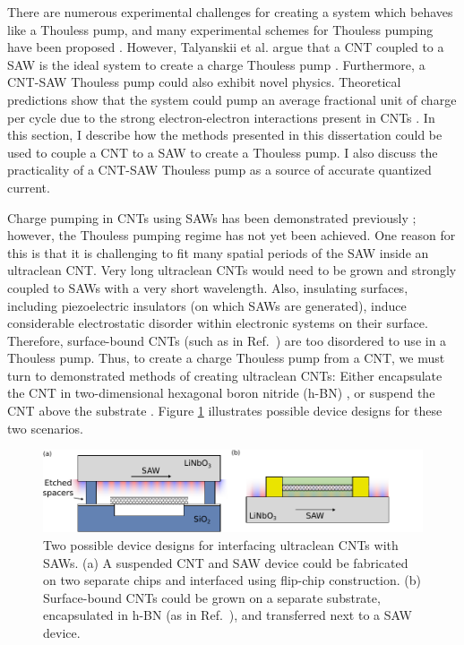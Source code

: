 \documentclass{beavtex_dub_edit}
\begin{document}
There are numerous experimental challenges for creating a system which behaves like a Thouless pump, and many experimental schemes for Thouless pumping have been proposed \cite{citro_thouless_2023}. However, Talyanskii et al. argue that a CNT coupled to a SAW is the ideal system to create a charge Thouless pump \cite{talyanskii_quantized_2001}. Furthermore, a CNT-SAW Thouless pump could also exhibit novel physics. Theoretical predictions show that the system could pump an average fractional unit of charge per cycle due to the strong electron-electron interactions present in CNTs \cite{novikov_devils_2005}. In this section, I describe how the methods presented in this dissertation could be used to couple a CNT to a SAW to create a Thouless pump. I also discuss the practicality of a CNT-SAW Thouless pump as a source of accurate quantized current.

Charge pumping in CNTs using SAWs has been demonstrated previously \cite{buitelaar_adiabatic_2008}; however, the Thouless pumping regime has not yet been achieved. One reason for this is that it is challenging to fit many spatial periods of the SAW inside an ultraclean CNT. Very long ultraclean CNTs would need to be grown and strongly coupled to SAWs with a very short wavelength. Also, insulating surfaces, including piezoelectric insulators (on which SAWs are generated), induce considerable electrostatic disorder within electronic systems on their surface. Therefore, surface-bound CNTs (such as in Ref.\ \cite{buitelaar_adiabatic_2008}) are too disordered to use in a Thouless pump. Thus, to create a charge Thouless pump from a CNT, we must turn to demonstrated methods of creating ultraclean CNTs: Either encapsulate the CNT in two-dimensional hexagonal boron nitride (h-BN) \cite{huang_superior_2015}, or suspend the CNT above the substrate \cite{senger_universal_2018}. Figure \ref{Thouless pump designs} illustrates possible device designs for these two scenarios.


\begin{figure}
    \includegraphics[width = 1\textwidth]{Intro thouless pump designs.pdf}
    \caption{Two possible device designs for interfacing ultraclean CNTs with SAWs. (a) A suspended CNT and SAW device could be fabricated on two separate chips and interfaced using flip-chip construction. (b) Surface-bound CNTs could be grown on a separate substrate, encapsulated in h-BN (as in Ref.\ \cite{huang_superior_2015}), and transferred next to a SAW device.}
    \label{Thouless pump designs}
\end{figure}
\end{document}
